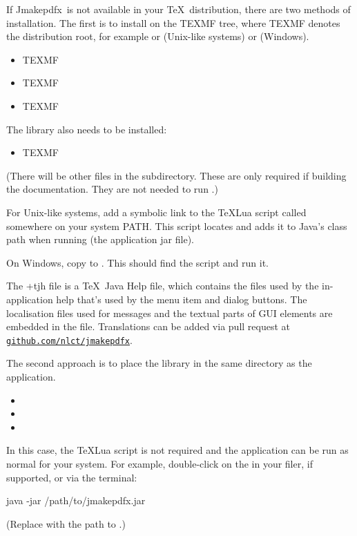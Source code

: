 \documentclass[toc=listof]{scrreport}
\newcommand{\Jmakepdfx}{Jmakepdfx}
\begin{document}
If \Jmakepdfx\ is not available in your \TeX\ distribution, 
there are two methods of installation. The first is to install on
the TEXMF tree, where TEXMF denotes the distribution root, for
example 
or  (Unix-like systems) 
or  (Windows).

\begin{itemize}
\item TEXMF
\item TEXMF
\item TEXMF
\end{itemize}

The  library also needs to be installed:
\begin{itemize}
\item TEXMF
\end{itemize}
(There will be other files in the 
subdirectory. These are only required if building the
documentation. They are not needed to run .)

For Unix-like systems, add a symbolic link to the
\TeX Lua script  called
 somewhere on your system PATH.
This script locates  and adds it to Java's
class path when running  (the application jar
file).

On Windows, copy  to .
This should find the  script and run it.

\begin{information}
The \ext+{tjh} file is a \TeX\ Java Help file, which contains the
files used by the in-application help that's used by the
 menu item and dialog  buttons.
The localisation files used for messages and the textual parts of
\gls{GUI} elements are embedded in the  file.
Translations can be added via pull request at
\href{https://github.com/nlct/jmakepdfx}{\nolinkurl{github.com/nlct/jmakepdfx}}.
\end{information}

The second approach is to place the 
library in the same directory as the 
application.
\begin{itemize}
\item {}
\item {}
\item {}
\end{itemize}
In this case, the \TeX Lua script is not required and the
 application can be run as normal for your
system. For example, double-click on the 
in your filer, if supported, or via the terminal:
\begin{terminal}
java -jar /path/to/jmakepdfx.jar
\end{terminal}
(Replace  with the path to
.)
\end{document}
